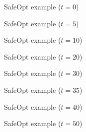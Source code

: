 \documentclass[xetex,10pt,mathserif,handout]{beamer}
\newlength\figureheight
\newlength\figurewidth
\begin{document}
\begin{frame}{SafeOpt example ($t = 0$)}
  \centering
  \setlength\figurewidth{5in}
  \setlength\figureheight{3.5in}
  
\end{frame}

\begin{frame}{SafeOpt example ($t = 5$)}
  \centering
  \setlength\figurewidth{5in}
  \setlength\figureheight{3.5in}
  
\end{frame}

\begin{frame}{SafeOpt example ($t = 10$)}
  \centering
  \setlength\figurewidth{5in}
  \setlength\figureheight{3.5in}
  
\end{frame}

\begin{frame}{SafeOpt example ($t = 20$)}
  \centering
  \setlength\figurewidth{5in}
  \setlength\figureheight{3.5in}
  
\end{frame}

\begin{frame}{SafeOpt example ($t = 30$)}
  \centering
  \setlength\figurewidth{5in}
  \setlength\figureheight{3.5in}
  
\end{frame}

\begin{frame}{SafeOpt example ($t = 35$)}
  \centering
  \setlength\figurewidth{5in}
  \setlength\figureheight{3.5in}
  
\end{frame}

\begin{frame}{SafeOpt example ($t = 40$)}
  \centering
  \setlength\figurewidth{5in}
  \setlength\figureheight{3.5in}
  
\end{frame}

\begin{frame}{SafeOpt example ($t = 50$)}
  \centering
  \setlength\figurewidth{5in}
  \setlength\figureheight{3.5in}
  
\end{frame}

\end{document}
